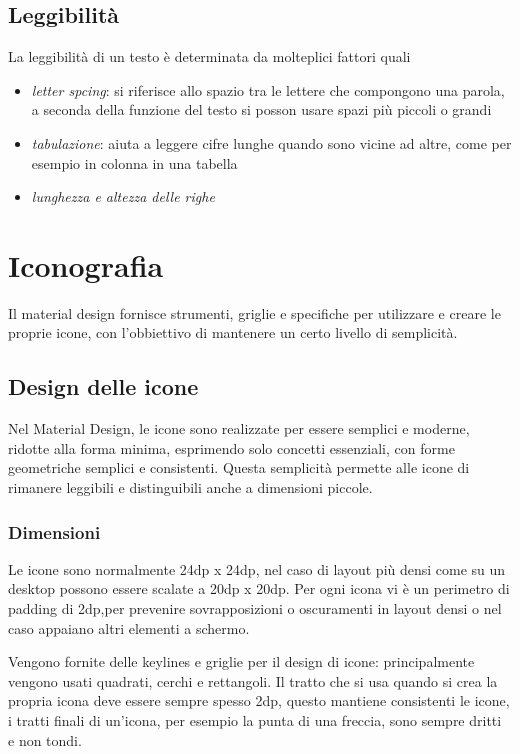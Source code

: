 \documentclass[12pt, a4paper]{report}
\begin{document}
	\subsection{Leggibilità}
	La leggibilità di un testo è determinata da molteplici fattori quali
	\begin{itemize}
		\item \textit{letter spcing}: si riferisce allo spazio tra le lettere che compongono una parola, a seconda della funzione del testo si posson usare spazi più piccoli o grandi
		\item \textit{tabulazione}: aiuta a leggere cifre lunghe quando sono vicine ad altre, come per esempio in colonna in una tabella
		\item \textit{lunghezza e altezza delle righe}
	\end{itemize}




	\section{Iconografia}
		Il material design fornisce strumenti, griglie e specifiche per utilizzare e creare le proprie icone, con l'obbiettivo di mantenere un certo livello di semplicità.
		\subsection{Design delle icone}
			Nel Material Design, le icone sono realizzate per essere semplici e moderne, ridotte alla forma minima, esprimendo solo concetti essenziali, con forme geometriche semplici e consistenti. Questa semplicità permette alle icone di rimanere leggibili e distinguibili anche a dimensioni piccole.

			\subsubsection{Dimensioni}
			Le icone sono normalmente 24dp x 24dp, nel caso di layout più densi come su un desktop possono essere scalate a 20dp x 20dp.
			Per ogni icona vi è un perimetro di padding di 2dp,per prevenire sovrapposizioni o oscuramenti in layout densi o nel caso appaiano altri elementi a schermo.

			Vengono fornite delle keylines e griglie per il design di icone: principalmente vengono usati quadrati, cerchi e rettangoli.
			Il tratto che si usa quando si crea la propria icona deve essere sempre spesso 2dp, questo mantiene consistenti le icone, i tratti finali di un'icona, per esempio la punta di una freccia, sono sempre dritti e non tondi.
\end{document}
